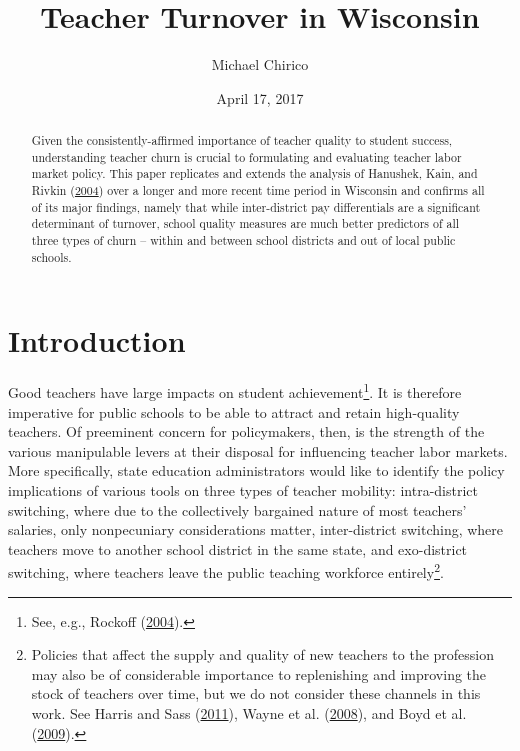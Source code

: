 \documentclass[12pt,]{article}
\title{Teacher Turnover in Wisconsin}
\author{Michael Chirico}
\date{April 17, 2017}
\let\rmarkdownfootnote\footnote%
\def\footnote{\protect\rmarkdownfootnote}
\begin{document}
\maketitle
\begin{abstract}
Given the consistently-affirmed importance of teacher quality to student
success, understanding teacher churn is crucial to formulating and
evaluating teacher labor market policy. This paper replicates and
extends the analysis of Hanushek, Kain, and Rivkin
(\protect\hyperlink{ref-hanushek}{2004}) over a longer and more recent
time period in Wisconsin and confirms all of its major findings, namely
that while inter-district pay differentials are a significant
determinant of turnover, school quality measures are much better
predictors of all three types of churn -- within and between school
districts and out of local public schools.
\end{abstract}

\section{Introduction}\label{introduction}

Good teachers have large impacts on student achievement\footnote{See,
  e.g., Rockoff (\protect\hyperlink{ref-rockoff}{2004}).}. It is
therefore imperative for public schools to be able to attract and retain
high-quality teachers. Of preeminent concern for policymakers, then, is
the strength of the various manipulable levers at their disposal for
influencing teacher labor markets. More specifically, state education
administrators would like to identify the policy implications of various
tools on three types of teacher mobility: intra-district switching,
where due to the collectively bargained nature of most teachers'
salaries, only nonpecuniary considerations matter, inter-district
switching, where teachers move to another school district in the same
state, and exo-district switching, where teachers leave the public
teaching workforce entirely\footnote{Policies that affect the supply and
  quality of new teachers to the profession may also be of considerable
  importance to replenishing and improving the stock of teachers over
  time, but we do not consider these channels in this work. See Harris
  and Sass (\protect\hyperlink{ref-harris}{2011}), Wayne et al.
  (\protect\hyperlink{ref-wayne}{2008}), and Boyd et al.
  (\protect\hyperlink{ref-boyd2009}{2009}).}.
\end{document}
